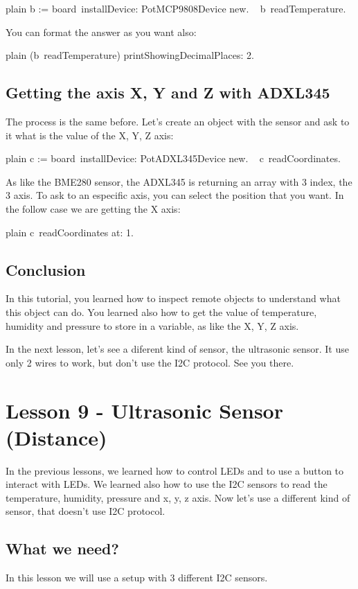 \documentclass[10pt,twoside,english]{_support/latex/sbabook/sbabook}
\begin{document}
\begin{displaycode}{plain}
b := board installDevice: PotMCP9808Device new. ​ 
b readTemperature.  
\end{displaycode}

You can format the answer as you want also:

\begin{displaycode}{plain}
(b readTemperature) printShowingDecimalPlaces: 2.
\end{displaycode}
\section{Getting the axis X, Y and Z with ADXL345}
The process is the same before. Let's create an object with the sensor and ask to it what is the value of the X, Y, Z axis:

\begin{displaycode}{plain}
c := board installDevice: PotADXL345Device new. ​ 
c readCoordinates. 
\end{displaycode}

As like the BME280 sensor, the ADXL345 is returning an array with 3 index, the 3 axis. To ask to an especific axis, you can select the position that you want. In the follow case we are getting the X axis:

\begin{displaycode}{plain}
c readCoordinates at: 1.
\end{displaycode}
\section{Conclusion}
In this tutorial, you learned how to inspect remote objects to understand what this object can do. You learned also how to get the value of temperature, humidity and pressure to store in a variable, as like the X, Y, Z axis. 

In the next lesson, let’s see a diferent kind of sensor, the ultrasonic sensor. It use only 2 wires to work, but don't use the I2C protocol. See you there.
\chapter{Lesson 9 - Ultrasonic Sensor (Distance)}
In the previous lessons, we learned how to control LEDs and to use a button to interact with LEDs. We learned also how to use the I2C sensors to read the temperature, humidity, pressure and x, y, z axis. Now let's use a different kind of sensor, that doesn't use I2C protocol. 
\section{What we need?}
In this lesson we will use a setup with 3 different I2C sensors.
\end{document}
